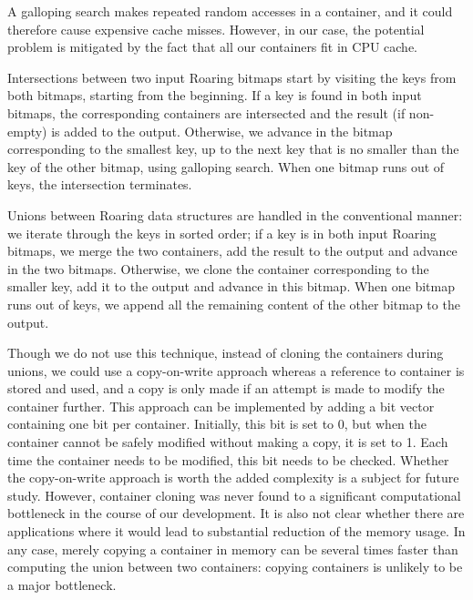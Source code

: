 \documentclass[times]{speauth}
\begin{document}
A galloping search makes repeated random accesses in a container,
and it could therefore cause expensive cache misses. However, in our case, the potential problem is mitigated by the fact that
all our containers fit in CPU cache.


Intersections between two input Roaring bitmaps start by visiting
the keys from both bitmaps, starting from the beginning. If a key
is found in both
input bitmaps, the corresponding containers are intersected and the result (if non-empty) is added to the output. Otherwise, we advance in the bitmap corresponding to the smallest key, up to the next key that is no smaller than the key of the other bitmap,
using galloping search. When one bitmap runs out of keys, the intersection terminates.

Unions between Roaring data structures
are handled in the conventional manner:
we iterate through the keys in sorted order; if a key is in both
input Roaring bitmaps, we merge the two containers, add the result to the output and advance in the two bitmaps. Otherwise, we clone the container corresponding to the smaller key, add it to the output and advance in this bitmap. When one bitmap runs out of keys, we  append all the remaining content of the other bitmap to the output.

Though we do not use this technique, instead of cloning the containers during unions, we could use a copy-on-write approach whereas a reference to container is stored and used, and a copy is only made if an attempt is made to modify the container further.
This approach can be implemented by adding a bit vector containing one bit per container. Initially, this bit is set to 0, but when the container cannot be safely modified without making a copy, it is set to 1. Each time the container needs to be modified, this bit needs to be checked.
 Whether the copy-on-write approach is worth the added complexity is a subject for future study. However, container cloning was never found  to  a significant computational bottleneck in the course of our development. It is also not clear whether there are applications where it would lead to substantial reduction of the memory usage.
 In any case, merely copying a container in memory can be several times faster than computing the union between two containers:
copying containers is unlikely to be a major bottleneck.
\end{document}
